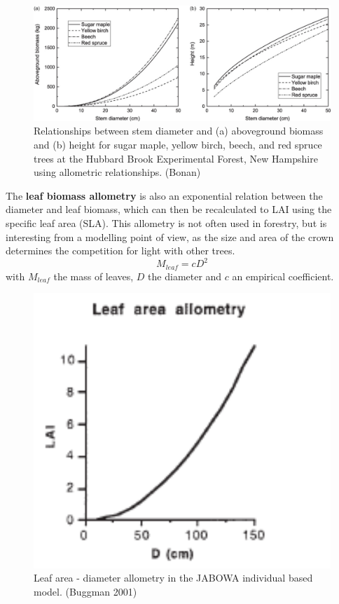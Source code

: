 \documentclass[12pt,oneside]{book}
\begin{document}
\begin{figure}

{\centering \includegraphics[width=0.8\linewidth]{figures/chap6/f621_BD_allom} 

}

\caption{Relationships between stem diameter and (a) aboveground biomass and (b) height for sugar maple, yellow birch, beech, and red spruce trees at the Hubbard Brook Experimental Forest, New Hampshire using allometric relationships. (Bonan)}\label{fig:f621}
\end{figure}

The \textbf{leaf biomass allometry} is also an exponential relation
between the diameter and leaf biomass, which can then be recalculated to
LAI using the specific leaf area (SLA). This allometry is not often used
in forestry, but is interesting from a modelling point of view, as the
size and area of the crown determines the competition for light with
other trees. \[
M_{leaf}=cD^2
\] with \(M_{leaf}\) the mass of leaves, \(D\) the diameter and \(c\) an
empirical coefficient.

\begin{figure}

{\centering \includegraphics[width=0.8\linewidth]{figures/chap6/f622_LD_allom} 

}

\caption{Leaf area - diameter allometry in the JABOWA individual based model. (Buggman 2001)}\label{fig:f622}
\end{figure}
\end{document}
